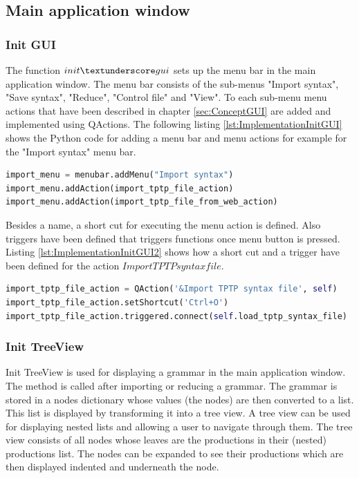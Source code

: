 \subsection{Main application window}\label{sec:ImplementationGUIMainAppli}

\subsubsection{Init GUI}\label{sec:ImplementationGUIInit}

The function $init\textunderscore gui$ sets up the menu bar in the main application window. The menu bar consists of the sub-menus "Import syntax", "Save syntax", "Reduce", "Control file" and "View". To each sub-menu menu actions that have been described in chapter \ref{sec:ConceptGUI} are added and implemented using QActions. The following listing \ref{lst:ImplementationInitGUI} shows the Python code for adding a menu bar and menu actions for example for the "Import syntax" menu bar.

\begin{lstlisting}[language=Python, basicstyle=\scriptsize	,caption= Implementation of menu bar,label= lst:ImplementationInitGUI]
import_menu = menubar.addMenu("Import syntax")
import_menu.addAction(import_tptp_file_action)
import_menu.addAction(import_tptp_file_from_web_action)
\end{lstlisting}

Besides a name, a short cut for executing the menu action is defined. Also triggers have been defined that triggers functions once menu button is pressed. Listing \ref{lst:ImplementationInitGUI2} shows how a short cut and a trigger have been defined for the action $Import TPTP syntax file$.

\begin{lstlisting}[language=Python, basicstyle=\scriptsize	,caption= Implementation of menu actions,label= lst:ImplementationInitGUI2]
import_tptp_file_action = QAction('&Import TPTP syntax file', self)
import_tptp_file_action.setShortcut('Ctrl+O')
import_tptp_file_action.triggered.connect(self.load_tptp_syntax_file)
\end{lstlisting}


\subsubsection{Init TreeView}\label{sec:ImplementationGUIInitTreeView}
Init TreeView is used for displaying a grammar in the main application window. The method is called after importing or reducing a grammar. The grammar is stored in a nodes dictionary whose values (the nodes) are then converted to a list. This list is displayed by transforming it into a tree view. A tree view can be used for displaying nested lists and allowing a user to navigate through them. The tree view consists of all nodes whose leaves are the productions in their (nested) productions list. The nodes can be expanded to see their productions which are then displayed indented and underneath the node.

